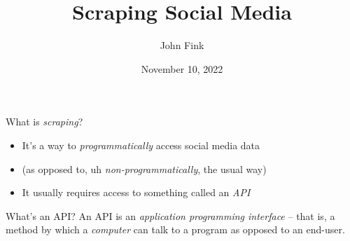 \documentclass{beamer}
\title{Scraping Social Media}
\author{John Fink}
\date{November 10, 2022}
\begin{document}
\begin{frame}[plain]
    \maketitle
\end{frame} 
\begin{frame}{What is \textit{scraping}?}
	\begin{itemize}
		\pause
		\item It's a way to \textit{programmatically} access social media data
		\pause
		\item (as opposed to, uh \textit{non-programmatically}, the usual way)
		\pause
		\item It usually requires access to something called an \textit{API}
	\end{itemize}
\end{frame}
\begin{frame}{What's an API?}
	An API is an \textit{application programming interface} -- that is, a method by which a \textit{computer} can talk to a program as opposed to an end-user.
\end{frame}
\end{document}
